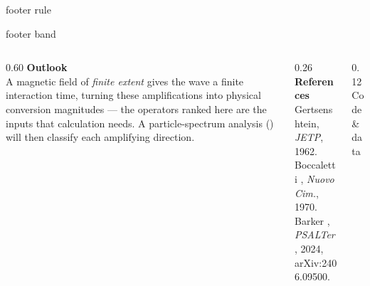\vspace{1ex}

\begin{beamercolorbox}[wd=\linewidth,ht=1.1ex,sep=0pt]{footer rule}\end{beamercolorbox}
\nointerlineskip

\begin{beamercolorbox}[wd=\linewidth,sep=2.5ex]{footer band}
  \begin{columns}[T]
    \begin{column}{0.60\linewidth}
      {\large\bfseries Outlook}\\[0.4ex]
      A magnetic field of \emph{finite extent} gives the wave a finite
      interaction time, turning these amplifications into physical conversion
      magnitudes --- the operators ranked here are the inputs that calculation
      needs. A particle-spectrum analysis (\PSALTer{}) will then classify each
      amplifying direction.
    \end{column}
    \begin{column}{0.26\linewidth}
      {\large\bfseries References}\\[0.4ex]
      {\small
       Gertsenshtein, \emph{JETP}, 1962.\\
       Boccaletti \etal, \emph{Nuovo Cim.}, 1970.\\
       Barker \etal, \emph{PSALTer}, 2024, arXiv:2406.09500.}
    \end{column}
    \begin{column}{0.12\linewidth}
      \centering
      \colorbox{white}{}\\[0.3ex]
      {\small Code \& data}
    \end{column}
  \end{columns}
\end{beamercolorbox}
